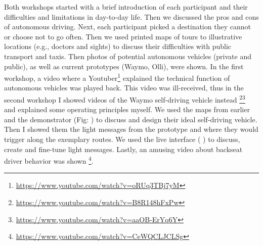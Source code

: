 Both workshops started with a brief introduction of each participant and their difficulties and limitations in day-to-day life. Then we discussed the pros and cons of autonomous driving. Next, each participant picked a destination they cannot or choose not to go often. Then we used printed maps of tours to illustrative locations (e.g., doctors and sights) to discuss their difficulties with public transport and taxis. Then photos of potential autonomous vehicles (private and public), as well as current prototypes (Waymo, Olli), were shown. In the first workshop, a video where a Youtuber\footnote{\url{https://www.youtube.com/watch?v=oRUq3TBj7yM}} explained the technical function of autonomous vehicles was played back. This video was ill-received, thus in the second workshop I showed videos of the Waymo self-driving vehicle instead \footnote{\url{https://www.youtube.com/watch?v=B8R148hFxPw}}\fnsep\footnote{\url{https://www.youtube.com/watch?v=aaOB-ErYq6Y}}  and explained some operating principles myself. We used the maps from earlier and the demonstrator (Fig: ) to discuss and design their ideal self-driving vehicle. Then I showed them the light messages from the prototype and where they would trigger along the exemplary routes. We used the live interface ( ) to discuss, create and fine-tune light messages. Lastly, an amusing video about backseat driver behavior was shown \footnote{\url{https://www.youtube.com/watch?v=CeWQCLJCLSg}}. 

